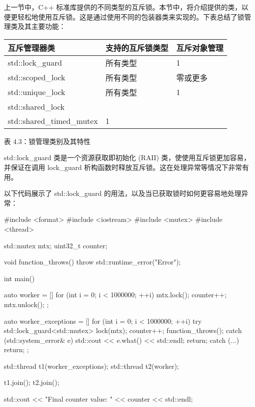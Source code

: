 
上一节中，C++ 标准库提供的不同类型的互斥锁。本节中，将介绍提供的类，以便更轻松地使用互斥锁。这是通过使用不同的包装器类来实现的。下表总结了锁管理类及其主要功能：

\begin{longtable}{|l|l|l|}
\hline
\textbf{互斥管理器类} & \textbf{支持的互斥锁类型}                                                          & \textbf{互斥对象管理} \\ \hline
\endfirsthead
%
\endhead
%
std::lock\_guard  & 所有类型 & 1            \\ \hline
std::scoped\_lock & 所有类型 & 零或更多 \\ \hline
std::unique\_lock & 所有类型 & 1            \\ \hline
std::shared\_lock            & \begin{tabular}[c]{@{}l@{}}std::shared\_mutex \\ std::shared\_timed\_mutex\end{tabular} & 1                        \\ \hline
\end{longtable}

\begin{center}
表 4.3：锁管理类别及其特性
\end{center}


std::lock\_guard 类是一个资源获取即初始化 (RAII) 类，使使用互斥锁更加容易，并保证在调用 lock\_guard 析构函数时释放互斥锁。这在处理异常等情况下非常有用。

以下代码展示了 std::lock\_guard 的用法，以及当已获取锁时如何更容易地处理异常：

\begin{cpp}
#include <format>
#include <iostream>
#include <mutex>
#include <thread>

std::mutex mtx;
uint32_t counter{};

void function_throws() { throw std::runtime_error("Error"); }

int main() {
    auto worker = [] {
        for (int i = 0; i < 1000000; ++i) {
            mtx.lock();
            counter++;
            mtx.unlock();
        }
    };

    auto worker_exceptions = [] {
        for (int i = 0; i < 1000000; ++i) {
            try {
                std::lock_guard<std::mutex> lock(mtx);
                counter++;
                function_throws();
            } catch (std::system_error& e) {
                std::cout << e.what() << std::endl;
                return;
            } catch (...) {
                return;
            }
        }
    };

    std::thread t1(worker_exceptions);
    std::thread t2(worker);

    t1.join();
    t2.join();

    std::cout << "Final counter value: " << counter << std::endl;
}
\end{cpp}

